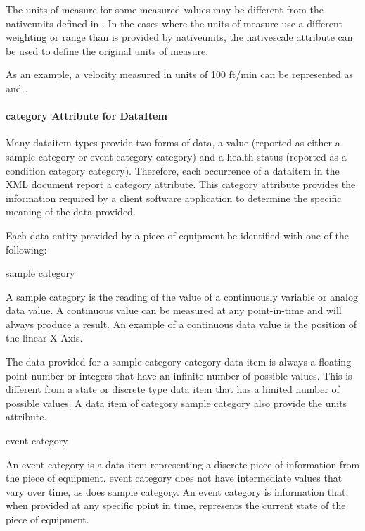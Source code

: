 \documentclass{mtconnect}	%
\begin{document}
The units of measure for some measured values may be different from the \gls{nativeunits} defined in .   In the cases where the units of measure use a different weighting or range than is provided by \gls{nativeunits}, the \gls{nativescale} attribute can be used to define the original units of measure.

As an example, a velocity measured in units of 100 ft/min can be represented as  and . 

\paragraph{category Attribute for DataItem}
\label{sec:category Attribute for DataItem}\mbox{}

Many \gls{dataitem} types provide two forms of data, a value (reported as either a \gls{sample category} or \gls{event category} category) and a health status (reported as a \gls{condition category} category).  Therefore, each occurrence of a \gls{dataitem} in the XML document \must report a \gls{category} attribute.  This \gls{category} attribute provides the information required by a client software application to determine the specific meaning of the data provided.

Each \gls{data entity} provided by a piece of equipment \must be identified with one of the following:

\gls{sample category}

\tab A \gls{sample category} is the reading of the value of a continuously variable or analog data value.  A continuous value can be measured at any point-in-time and will always produce a result.  An example of a continuous data value is the position of the \gls{linear} X Axis.   

The data provided for a \gls{sample category} category data item is always a floating point number or integers that have an infinite number of possible values.  This is different from a state or discrete type data item that has a limited number of possible values.  A data item of category \gls{sample category} \must also provide the \gls{units} attribute.

\gls{event category}

\tab An \gls{event category} is a data item representing a discrete piece of information from the piece of equipment.  \gls{event category} does not have intermediate values that vary over time, as does \gls{sample category}.   An \gls{event category} is information that, when provided at any specific point in time, represents the current state of the piece of equipment.
\end{document}
